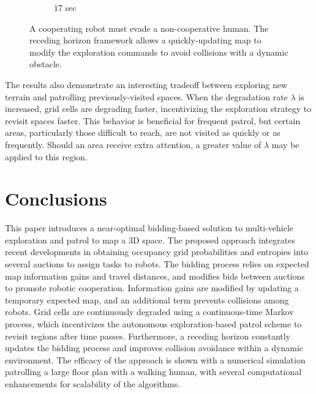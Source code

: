 \documentclass[smallextended]{svjour3}       %
\begin{document}
\begin{figure}[!t]
\begin{subfigure}[t]{0.3\columnwidth}
        		\caption{$17$ sec}
    	\end{subfigure}
	\caption{A cooperating robot must evade a non-cooperative human. The receding horizon framework allows a quickly-updating map to modify the exploration commands to avoid collisions with a dynamic obstacle.}
	\label{fig:EvadeHuman}
\end{figure}

The results also demonstrate an interesting tradeoff between exploring new terrain and patrolling previously-visited spaces. When the degradation rate $\lambda$ is increased, grid cells are degrading faster, incentivizing the exploration strategy to revisit spaces faster. This behavior is beneficial for frequent patrol, but certain areas, particularly those difficult to reach, are not visited as quickly or as frequently. Should an area receive extra attention, a greater value of $\lambda$ may be applied to this region.


\section{Conclusions}
\label{sec:Conclusions}

This paper introduces a near-optimal bidding-based solution to multi-vehicle exploration and patrol to map a 3D space. The proposed approach integrates recent developments in obtaining occupancy grid probabilities and entropies into several auctions to assign tasks to robots. The bidding process relies on expected map information gains and travel distances, and modifies bids between auctions to promote robotic cooperation. Information gains are modified by updating a temporary expected map, and an additional term prevents collisions among robots. Grid cells are continuously degraded using a continuous-time Markov process, which incentivizes the autonomous exploration-based patrol scheme to revisit regions after time passes. Furthermore, a receding horizon constantly updates the bidding process and improves collision avoidance within a dynamic environment. The efficacy of the approach is shown with a numerical simulation patrolling a large floor plan with a walking human, with several computational enhancements for scalability of the algorithms.


%
%
%
\end{document}
